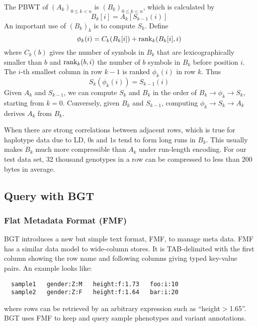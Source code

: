 \documentclass{bioinfo}
\begin{document}
\begin{methods}
The PBWT of $(A_k)_{0\le k<n}$ is $(B_k)_{0\le k<n}$, which is
calculated by
\begin{equation*}\label{eq:B}
B_k[i]=A_k[S_{k-1}(i)]
\end{equation*}
An important use of $(B_k)_k$ is to compute $S_k$. Define
\begin{equation*}\label{eq:phi}
\phi_k(i)=C_k(B_k[i])+{\rm rank}_k(B_k[i],i)
\end{equation*}
where $C_k(b)$ gives the number of symbols in $B_k$ that are lexicographically
smaller than $b$ and ${\rm rank}_k(b,i)$ the number of $b$ symbols in $B_k$
before position $i$. The $i$-th smallest column in row $k-1$ is ranked
$\phi_k(i)$ in row $k$. Thus
\begin{equation*}\label{eq:trans}
S_k(\phi_k(i))=S_{k-1}(i)
\end{equation*}
Given $A_k$ and $S_{k-1}$, we can compute $S_k$ and $B_k$ in the order of
$B_k\to\phi_k\to S_k$, starting from $k=0$. Conversely, given $B_k$ and
$S_{k-1}$, computing $\phi_k\to S_k\to A_k$ derives $A_k$ from $B_k$.

When there are strong correlations between adjacent rows, which is true for
haplotype data due to LD, $0$s and $1$s tend to form long
runs in $B_k$. This usually makes $B_k$ much more compressible than $A_k$ under
run-length encoding. For our test data set, 32 thousand genotypes in a row can
be compressed to less than 200 bytes in average.

\subsection{Query with BGT}

\subsubsection{Flat Metadata Format (FMF)}

BGT introduces a new but simple text format, FMF, to manage meta data. FMF has
a similar data model to wide-column stores. It is TAB-delimited with the first
column showing the row name and following columns giving typed key-value pairs.
An example looks like:
\begin{center}
\begin{verbatim}
  sample1   gender:Z:M   height:f:1.73   foo:i:10
  sample2   gender:Z:F   height:f:1.64   bar:i:20
\end{verbatim}
\end{center}
where rows can be retrieved by an arbitrary expression such as
``height$>$1.65''. BGT uses FMF to keep and query sample phenotypes and variant
annotations.


\end{methods}
\end{document}
